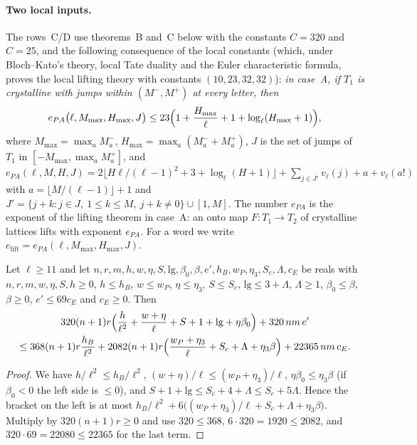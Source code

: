 \paragraph{Two local inputs.}
The rows~C/D use theorems~B and~C below with the constants $C=320$ and $C=25$, and the following consequence of the
local constants  (which, under
Bloch--Kato's theory, local Tate duality and the Euler characteristic formula, proves the local lifting theory with
constants $(10,23,32,32)$): \emph{in case~A, if $T_1$ is crystalline with jumps within $(M^-,M^+)$ at every letter, then}
\begin{equation}\label{pf:linkN-adm:eq-ePA}
e_{PA}\bigl(\ell,M_{\max},H_{\max},J\bigr)\le23\Bigl(1+\frac{H_{\max}}{\ell}+1+\log_\ell(H_{\max}+1)\Bigr),
\end{equation}
where $M_{\max}=\max_aM^-_a$, $H_{\max}=\max_a(M^-_a+M^+_a)$, $J$ is the set of jumps of $T_1$ in $[-M_{\max},\max_aM^+_a]$, and
$e_{PA}(\ell,M,H,J)=2\lfloor H\ell/(\ell-1)^2+3+\log_\ell(H+1)\rfloor+\sum_{j\in J'}v_\ell(j)+a+v_\ell(a!)$ with
$a=\lfloor M/(\ell-1)\rfloor+1$ and $J'=\{j+k:j\in J,\ 1\le k\le M,\ j+k\ne0\}\cup[1,M]$. The number $e_{PA}$ is the
exponent of the lifting theorem in case~A: an onto map $F\colon T_1\to T_2$ of crystalline lattices lifts with exponent
$e_{PA}$. For a word we write $e_{\mathrm{lift}}=e_{PA}(\ell,M_{\max},H_{\max},J)$.

\begin{lemma}\label{pf:linkN-adm:numNT}
Let $\ell\ge11$ and let $n,r,m,h,w,\eta,S,\mathrm{lg},\beta_0,\beta,e',h_B,w_P,\eta_3,S_c,\Lambda,c_E$ be reals with
$n,r,m,w,\eta,S,h\ge0$, $h\le h_B$, $w\le w_P$, $\eta\le\eta_3$, $S\le S_c$, $\mathrm{lg}\le3+\Lambda$, $\Lambda\ge1$,
$\beta_0\le\beta$, $\beta\ge0$, $e'\le69c_E$ and $c_E\ge0$. Then
\begin{multline*}
320(n+1)r\Bigl(\frac{h}{\ell^2}+\frac{w+\eta}{\ell}+S+1+\mathrm{lg}+\eta\beta_0\Bigr)+320\,nm\,e'\\
\le368(n+1)r\frac{h_B}{\ell^2}+2082(n+1)r\Bigl(\frac{w_P+\eta_3}{\ell}+S_c+\Lambda+\eta_3\beta\Bigr)+22365\,nm\,c_E.
\end{multline*}
\end{lemma}

\begin{proof}
We have $h/\ell^2\le h_B/\ell^2$, $(w+\eta)/\ell\le(w_P+\eta_3)/\ell$, $\eta\beta_0\le\eta_3\beta$ (if $\beta_0<0$ the
left side is $\le0$), and $S+1+\mathrm{lg}\le S_c+4+\Lambda\le S_c+5\Lambda$. Hence the bracket on the left is at most
$h_B/\ell^2+6\bigl((w_P+\eta_3)/\ell+S_c+\Lambda+\eta_3\beta\bigr)$. Multiply by $320(n+1)r\ge0$ and use $320\le368$,
$6\cdot320=1920\le2082$, and $320\cdot69=22080\le22365$ for the last term.
\end{proof}


